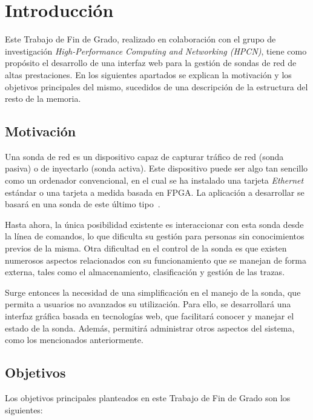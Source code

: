 \chapter{Introducción}

Este Trabajo de Fin de Grado, realizado en colaboración con el grupo de investigación \textit{High-Performance Computing and Networking (HPCN)}, tiene como propósito el desarrollo de una interfaz web para la gestión de sondas de red de altas prestaciones.
En los siguientes apartados se explican la motivación y los objetivos principales del mismo, sucedidos de una descripción de la estructura del resto de la memoria.

\section{Motivación}

Una sonda de red es un dispositivo capaz de capturar tráfico de red (sonda pasiva) o de inyectarlo (sonda activa).
Este dispositivo puede ser algo tan sencillo como un ordenador convencional, en el cual se ha instalado una tarjeta \textit{Ethernet} estándar o una tarjeta a medida basada en \gls{FPGA}.
La aplicación a desarrollar se basará en una sonda de este último tipo~\cite{jfzazo}.

Hasta ahora, la única posibilidad existente es interaccionar con esta sonda desde la línea de comandos, lo que dificulta su gestión para personas sin conocimientos previos de la misma.
Otra dificultad en el control de la sonda es que existen numerosos aspectos relacionados con su funcionamiento que se manejan de forma externa, tales como el almacenamiento, clasificación y gestión de las \glspl{traza}.

Surge entonces la necesidad de una simplificación en el manejo de la sonda, que permita a usuarios no avanzados su utilización.
Para ello, se desarrollará una interfaz gráfica basada en tecnologías web, que facilitará conocer y manejar el estado de la sonda. Además, permitirá administrar otros aspectos del sistema, como los mencionados anteriormente.

\section{Objetivos}

Los objetivos principales planteados en este Trabajo de Fin de Grado son los siguientes:

